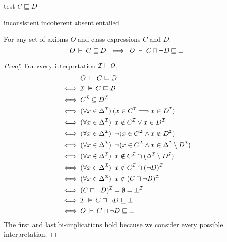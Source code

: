 \documentclass[paper.tex]{subfiles}
\begin{document}
\begin{algorithm}[H]
  \caption{test $C \sqsubseteq D$}
  \begin{algorithmic}[1]
    \raggedright
        \State \Return inconsistent
        \label{alg:testSubClassOf:returnInconsistent}
        \State \Return incoherent
        \label{alg:testSubClassOf:returnIncoherent}
        \State \Return absent
      \Else
        \State \Return entailed
        \label{alg:testSubClassOf:returnEntailed}
      \EndIf
    \EndFunction
  \end{algorithmic}
\end{algorithm}

\begin{lemma}
  \label{lem:subclassEntailsUnsat}
  For any set of axioms $O$ and class expressions $C$ and $D$,
  \[ O \:\vdash\: C \sqsubseteq D \;\iff\; O \:\vdash\: C \sqcap \neg D \sqsubseteq \bot \]
\end{lemma}
\begin{proof}
  For every interpretation $\mathcal{I} \vDash O$,
  \begin{align*}
    & O \:\vdash\: C \sqsubseteq D \\
    \iff{}& \mathcal{I} \:\vDash\: C \sqsubseteq D \\
    \iff{}& C^{\mathcal{I}} \subseteq D^{\mathcal{I}} \\
    \iff{}& (\forall x \in \Delta^{\mathcal{I}}) \; (x \in C^{\mathcal{I}} \!\!\implies\!\! x \in D^{\mathcal{I}}) \\
    \iff{}& (\forall x \in \Delta^{\mathcal{I}}) \;\; x \notin C^{\mathcal{I}} \lor x \in D^{\mathcal{I}} \\
    \iff{}& (\forall x \in \Delta^{\mathcal{I}}) \;\; \neg (x \in C^{\mathcal{I}} \land x \notin D^{\mathcal{I}}) \\
    \iff{}& (\forall x \in \Delta^{\mathcal{I}}) \;\; \neg (x \in C^{\mathcal{I}} \land x \in \Delta^{\mathcal{I}} \setminus D^{\mathcal{I}}) \\
    \iff{}& (\forall x \in \Delta^{\mathcal{I}}) \;\; x \notin C^{\mathcal{I}} \cap (\Delta^{\mathcal{I}} \setminus D^{\mathcal{I}}) \\
    \iff{}& (\forall x \in \Delta^{\mathcal{I}}) \;\; x \notin C^{\mathcal{I}} \cap (\neg D)^{\mathcal{I}} \\
    \iff{}& (\forall x \in \Delta^{\mathcal{I}}) \;\; x \notin (C \sqcap \neg D)^{\mathcal{I}} \\
    \iff{}& (C \sqcap \neg D)^{\mathcal{I}} = \emptyset = \bot^{\mathcal{I}} \\
    \iff{}& \mathcal{I} \:\vDash\: C \sqcap \neg D \sqsubseteq \bot \\
    \iff{}& O \:\vdash\: C \sqcap \neg D \sqsubseteq \bot
  \end{align*}
  The first and last bi-implications hold because we consider every possible interpretation.
\end{proof}
\end{document}
